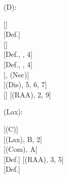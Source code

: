\documentclass[a4paper,english,fleqn,11pt,final]{scrartcl}
\newcommand{\negg}{{\sim}}
\newcommand{\limp}{\multimap}
\newcommand{\timp}{\rightarrowtriangle}
\newcommand{\tens}{\otimes}
\newcommand{\Deriv}[1]{{\normalfont\textsf{#1}}}
\newcommand{\oland}{\owedge}
\theoremstyle{plain}
\theoremstyle{definition}
\newcommand{\thm}{\text{\scriptsize\; (thm)}}
\begin{document}
{\begin{minipage}[t][][b]{.46\textwidth}
\Deriv{(D)}:

\medskip

{
\setlength{\fitchprfwidth}{1.63in}
\fitchprf{
\pline[A ]{\varphi \tens (\psi \ovee \vartheta)}
}
{
	\pline[1 ]{\varphi \tens \negg(\negg\psi \oland \negg \vartheta)}[]\\
	\pline[2 ]{\negg (\varphi \limp \negg \negg(\negg \psi \oland \negg\vartheta))}[Def.]\\
	\subproof{\pline[3 ]{\negg ((\varphi \tens \psi) \ovee (\varphi \tens \vartheta))}}
	{
		\pline[4 ]{\negg(\varphi \tens \psi) \oland \negg(\varphi \tens \vartheta)}[]\\
		\pline[5 ]{\varphi \limp \negg \psi}[Def., , 4]\\
		\pline[6 ]{\varphi \limp \negg \vartheta}[Def., , 4]\\
		\pline[7 ]{\hspace{-6pt}\brokenform{\varphi \limp \big(\negg\psi \timp (\negg\vartheta}
		{\formula{\timp \negg(\psi \ovee \vartheta))\big) \thm}} }[, \Deriv{(Nec)}]\\
		\pline[8 ]{\varphi \limp \negg(\psi \ovee \vartheta)}[\Deriv{(Dis)}, 5, 6, 7]\\
		\pline[9 ]{\varphi \limp \negg\negg(\negg\psi \oland \negg \vartheta)}[]
	}
	\pline[\slider]{(\varphi \tens \psi) \ovee (\varphi \tens \vartheta))}[\Deriv{(RAA)}, 2, 9]
}
}
\end{minipage}

\bigskip



\begin{minipage}[t][][b]{.43\textwidth}

\Deriv{(Lax)}:

\medskip

{
\setlength{\fitchprfwidth}{1.15in}
\fitchprf{
\pline[A ]{\varphi \tens \psi}\\
\pline[B ]{\vartheta}
}
{
\subproof{\pline[1 ]{\varphi \limp \negg\vartheta}}
{
	\pline[2 ]{\vartheta \limp \negg \varphi}[\Deriv{(C)}]\\
	\pline[3 ]{\psi \limp \negg \varphi}[\Deriv{(Lax)}, B, 2]\\
	\pline[4 ]{\psi \tens \varphi}[\Deriv{(Com)}, A]\\
	\pline[5 ]{\negg(\psi \limp \negg \varphi)}[Def.]
}
	\pline[4 ]{\negg(\varphi \limp \negg\vartheta)}[\Deriv{(RAA)}, 3, 5]\\
	\pline[\slider]{\varphi \tens \vartheta}[Def.]
}
}
\end{minipage}
\begin{minipage}[t][][b]{.46\textwidth}


\end{minipage}}
\end{document}
